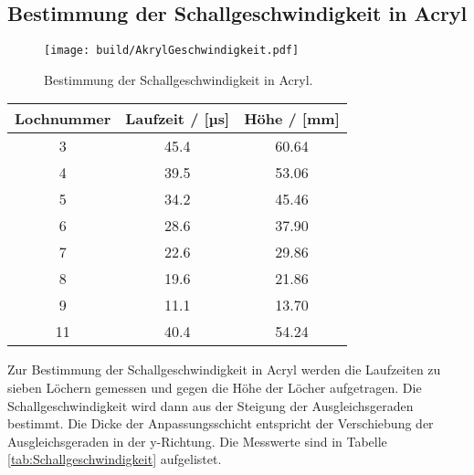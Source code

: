 \subsection{Bestimmung der Schallgeschwindigkeit in Acryl}
\label{sec:Schallgeschwindigkeit}

\begin{figure}[!ht]
    \centering
    \texttt{[image: build/AkrylGeschwindigkeit.pdf]}
    \caption{Bestimmung der Schallgeschwindigkeit in Acryl.}
    \label{fig:AkryllGeschwindigkeit}
\end{figure}

\begin{table}
    \centering
    \begin{tabular}{|c|c|c|}
        \toprule
        {Lochnummer} & {Laufzeit / [µs]} & {Höhe / [mm]} \\
        \midrule
        3 & 45.4 & 60.64\\
        4 & 39.5 & 53.06\\
        5 & 34.2 & 45.46\\
        6 & 28.6 & 37.90\\
        7 & 22.6 & 29.86\\
        8 & 19.6 & 21.86\\
        9 & 11.1 & 13.70\\
        11 & 40.4 & 54.24\\
        \bottomrule
    \end{tabular}
\end{table}

Zur Bestimmung der Schallgeschwindigkeit in Acryl werden die Laufzeiten zu sieben Löchern gemessen und gegen
die Höhe der Löcher aufgetragen. Die Schallgeschwindigkeit wird dann aus der Steigung der Ausgleichsgeraden bestimmt.
Die Dicke der Anpassungsschicht entspricht der Verschiebung der Ausgleichsgeraden in der y-Richtung.
Die Messwerte sind in Tabelle \ref{tab:Schallgeschwindigkeit} aufgelistet.